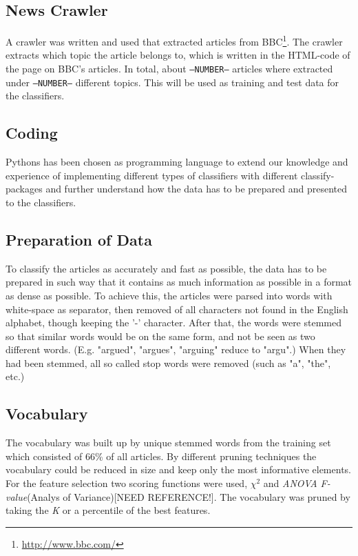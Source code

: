 \subsection{News Crawler}
A crawler was written and used that extracted articles from BBC\footnote{\url{http://www.bbc.com/}}. The crawler extracts which topic the article belongs to, which is written in the HTML-code of the page on BBC's articles. In total, about \texttt{--NUMBER--} articles where extracted under \texttt{--NUMBER--} different topics. This will be used as training and test data for the classifiers.
\subsection{Coding}
Pythons has been chosen as programming language to extend our knowledge and experience of implementing different types of classifiers with different classify-packages and further understand how the data has to be prepared and presented to the classifiers.
\subsection{Preparation of Data}
To classify the articles as accurately and fast as possible, the data has to be prepared in such way that it contains as much information as possible in a format as dense as possible. To achieve this, the articles were parsed into words with white-space as separator, then removed of all characters not found in the English alphabet, though keeping the '-' character. After that, the words were stemmed so that similar words would be on the same form, and not be seen as two different words. (E.g. "argued", "argues", "arguing" reduce to "argu".) When they had been stemmed, all so called stop words were removed (such as "a", "the", etc.)
\subsection{Vocabulary}
The vocabulary was built up by unique stemmed words from the training set which consisted of 66\% of all articles. By different pruning techniques the vocabulary could be reduced in size and keep only the most informative elements. For the feature selection two scoring functions were used, $\chi^2$ and \emph{ANOVA F-value}(Analys of Variance)[NEED REFERENCE!]. The vocabulary was pruned by taking the \emph{K} or a percentile of the best features.
